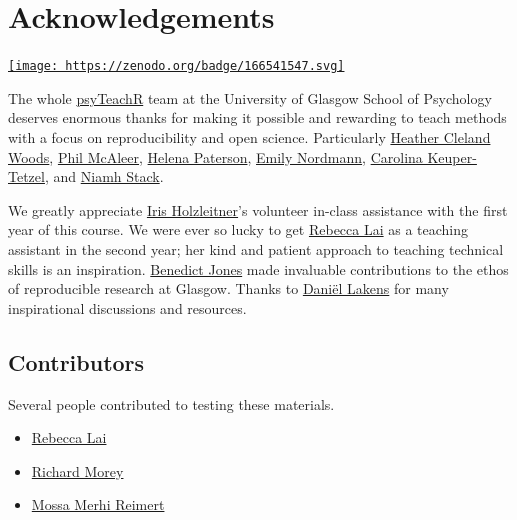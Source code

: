 \documentclass[
  oneside]{book}
\providecommand{\tightlist}{%
  \setlength{\itemsep}{0pt}\setlength{\parskip}{0pt}}
\begin{document}
\hypertarget{acknowledgements}{%
\chapter*{Acknowledgements}\label{acknowledgements}}

\href{https://zenodo.org/badge/latestdoi/166541547}{\texttt{[image: https://zenodo.org/badge/166541547.svg]}}

The whole \href{https://psyteachr.github.io}{psyTeachR} team at the University of Glasgow School of Psychology deserves enormous thanks for making it possible and rewarding to teach methods with a focus on reproducibility and open science. Particularly
\href{https://github.com/clelandwoods}{Heather Cleland Woods},
\href{https://github.com/philmcaleer}{Phil McAleer},
\href{https://github.com/HelenaPaterson}{Helena Paterson},
\href{https://github.com/emilynordmann}{Emily Nordmann},
\href{https://github.com/carolinakt}{Carolina Keuper-Tetzel}, and
\href{https://github.com/eavanmac}{Niamh Stack}.

We greatly appreciate \href{https://github.com/orgs/facelab/people/iholzleitner}{Iris Holzleitner}'s volunteer in-class assistance with the first year of this course. We were ever so lucky to get \href{https://github.com/RebeccaJLai}{Rebecca Lai} as a teaching assistant in the second year; her kind and patient approach to teaching technical skills is an inspiration. \href{https://www.strath.ac.uk/staff/jonesbenedictprofessor/}{Benedict Jones} made invaluable contributions to the ethos of reproducible research at Glasgow. Thanks to \href{https://github.com/Lakens}{Daniël Lakens} for many inspirational discussions and resources.

\hypertarget{contributors}{%
\section{Contributors}\label{contributors}}

Several people contributed to testing these materials.

\begin{itemize}
\tightlist
\item
  \href{https://github.com/RebeccaJLai}{Rebecca Lai}
\item
  \href{https://github.com/richarddmorey}{Richard Morey}
\item
  \href{https://github.com/CGMossa}{Mossa Merhi Reimert}
\end{itemize}
\end{document}
